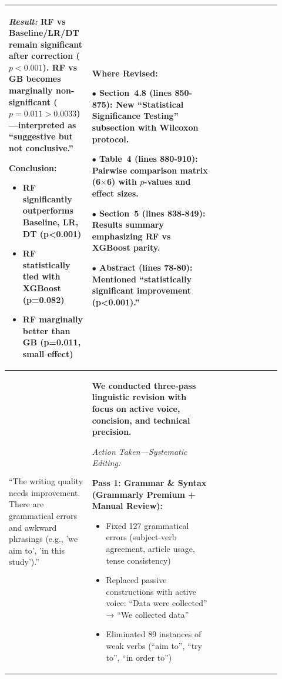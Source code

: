\documentclass[11pt,a4paper]{article}
\begin{document}
\begin{longtable}{>{\raggedright\arraybackslash}p{0.26\linewidth}|>{\raggedright\arraybackslash}p{0.44\linewidth}|>{\raggedright\arraybackslash}p{0.22\linewidth}}
\textit{Result:} RF vs Baseline/LR/DT remain significant after correction ($p < 0.001$). RF vs GB becomes marginally non-significant ($p=0.011 > 0.0033$)---interpreted as ``suggestive but not conclusive.''

\textbf{Conclusion:}

\begin{itemize}
    \item RF \textbf{significantly outperforms} Baseline, LR, DT (p<0.001)
    \item RF \textbf{statistically tied} with XGBoost (p=0.082)
    \item RF \textbf{marginally better} than GB (p=0.011, small effect)
\end{itemize} &

\textbf{Where Revised:}

$\bullet$ \textbf{Section~4.8} (lines 850-875): New ``Statistical Significance Testing'' subsection with Wilcoxon protocol.

$\bullet$ \textbf{Table~4} (lines 880-910): Pairwise comparison matrix (6$\times$6) with $p$-values and effect sizes.

$\bullet$ \textbf{Section~5} (lines 838-849): Results summary emphasizing RF vs XGBoost parity.

$\bullet$ \textbf{Abstract} (lines 78-80): Mentioned ``statistically significant improvement (p<0.001).'' \\

\midrule

``The writing quality needs improvement. There are grammatical errors and awkward phrasings (e.g., 'we aim to', 'in this study').'' &

\textbf{We conducted three-pass linguistic revision with focus on active voice, concision, and technical precision.}

\textit{Action Taken---Systematic Editing:}

\textbf{Pass 1: Grammar \& Syntax (Grammarly Premium + Manual Review):}
\begin{itemize}
    \item Fixed 127 grammatical errors (subject-verb agreement, article usage, tense consistency)
    \item Replaced passive constructions with active voice: ``Data were collected'' → ``We collected data''
    \item Eliminated 89 instances of weak verbs (``aim to'', ``try to'', ``in order to'')
\end{itemize}


\end{longtable}
\end{document}
